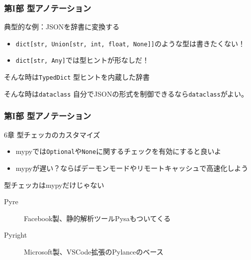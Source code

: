 \documentclass[aspectratio=169,dvipdfmx,12pt,notheorems]{beamer}
\theoremstyle{definition}
\begin{document}
\begin{frame}\frametitle{第I部 型アノテーション}

\begin{exampleblock}{典型的な例：JSONを辞書に変換する}
\begin{itemize}
\item \texttt{dict[str, Union[str, int, float, None]]}のような型は書きたくない！
\item \texttt{dict[str, Any]}では型ヒントが形なしだ！
\end{itemize}

\end{exampleblock}

\begin{block}{そんな時は\texttt{TypedDict}}
型ヒントを内蔵した辞書
\end{block}

\begin{block}{そんな時は\texttt{dataclass}}
自分でJSONの形式を制御できるなら\texttt{dataclass}がよい。
\end{block}

\end{frame}

\begin{frame}\frametitle{第I部 型アノテーション}

\begin{block}{6章 型チェッカのカスタマイズ}
\begin{itemize}
\item mypyでは\texttt{Optional}や\texttt{None}に関するチェックを有効にすると良いよ
\item mypyが遅い？ならばデーモンモードやリモートキャッシュで高速化しよう
\end{itemize}
\end{block}

\begin{exampleblock}{型チェッカはmypyだけじゃない}
\begin{description}
\item[Pyre] Facebook製、静的解析ツールPysaもついてくる
\item[Pyright] Microsoft製、VSCode拡張のPylanceのベース
\end{description}
\end{exampleblock}

\end{frame}
\end{document}

